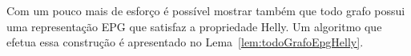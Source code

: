  
 
 Com um pouco mais de esforço é possível mostrar também que todo grafo possui uma representação EPG que satisfaz a propriedade Helly. Um algoritmo que efetua essa construção é apresentado no Lema~\ref{lem:todoGrafoEpgHelly}.
 
